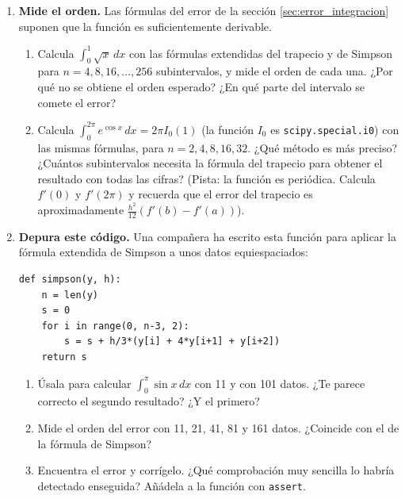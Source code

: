 \begin{enumerate}
\item \label{ej:orden_int} \textbf{Mide el orden.} Las fórmulas del error de la sección \ref{sec:error_integracion} suponen que la función es suficientemente derivable.
\begin{enumerate}
\item Calcula $\int_0^1\sqrt{x}\,dx$ con las fórmulas extendidas del trapecio y de Simpson para $n=4,8,16,\dots,256$ subintervalos, y mide el orden de cada una. ¿Por qué no se obtiene el orden esperado? ¿En qué parte del intervalo se comete el error?
\item Calcula $\int_0^{2\pi}e^{\cos x}\,dx=2\pi I_0(1)$ (la función $I_0$ es \texttt{scipy.special.i0}) con las mismas fórmulas, para $n=2,4,8,16,32$. ¿Qué método es más preciso? ¿Cuántos subintervalos necesita la fórmula del trapecio para obtener el resultado con todas las cifras? (Pista: la función es periódica. Calcula $f'(0)$ y $f'(2\pi)$ y recuerda que el error del trapecio es aproximadamente $\frac{h^2}{12}\left(f'(b)-f'(a)\right)$).
\end{enumerate}

\item \label{ej:depura_simpson} \textbf{Depura este código.} Una compañera ha escrito esta función para aplicar la fórmula extendida de Simpson a unos datos equiespaciados:
\begin{verbatim}
def simpson(y, h):
    n = len(y)
    s = 0
    for i in range(0, n-3, 2):
        s = s + h/3*(y[i] + 4*y[i+1] + y[i+2])
    return s
\end{verbatim}
\begin{enumerate}
\item Úsala para calcular $\int_0^\pi\sin x\,dx$ con 11 y con 101 datos. ¿Te parece correcto el segundo resultado? ¿Y el primero?
\item Mide el orden del error con 11, 21, 41, 81 y 161 datos. ¿Coincide con el de la fórmula de Simpson?
\item Encuentra el error y corrígelo. ¿Qué comprobación muy sencilla lo habría detectado enseguida? Añádela a la función con \texttt{assert}.
\end{enumerate}


\end{enumerate}
